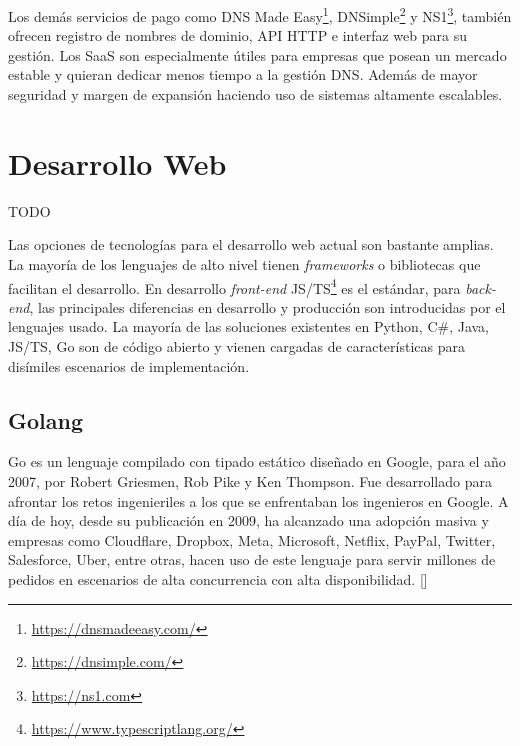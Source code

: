 Los demás servicios de pago como DNS Made Easy\footnote{\url{https://dnsmadeeasy.com/}}, DNSimple\footnote{\url{https://dnsimple.com/}} y NS1\footnote{\url{https://ns1.com}}, también ofrecen registro de nombres de dominio, API HTTP e interfaz web para su gestión. Los SaaS son especialmente útiles para empresas que posean un mercado estable y quieran dedicar menos tiempo a la gestión DNS. Además de mayor seguridad y margen de expansión haciendo uso de sistemas altamente escalables.






\section{Desarrollo Web}

TODO

Las opciones de tecnologías para el desarrollo web actual son bastante amplias. La mayoría de los lenguajes de alto nivel tienen \textit{frameworks} o bibliotecas que facilitan el desarrollo. En desarrollo \textit{front-end} JS/TS\footnote{\url{https://www.typescriptlang.org/}} es el estándar, para \textit{back-end}, las principales diferencias en desarrollo y producción son introducidas por el lenguajes usado. La mayoría de las soluciones existentes en Python, C\#, Java, JS/TS, Go son de código abierto y vienen cargadas de características para disímiles escenarios de implementación.

\subsection{Golang}

Go es un lenguaje compilado con tipado estático diseñado en Google, para el año 2007, por Robert Griesmen, Rob Pike y Ken Thompson. Fue desarrollado para afrontar los retos ingenieriles a los que se enfrentaban los ingenieros en Google. A día de hoy, desde su publicación en 2009, ha alcanzado una adopción masiva y empresas como Cloudflare, Dropbox, Meta, Microsoft, Netflix, PayPal, Twitter, Salesforce, Uber, entre otras, hacen uso de este lenguaje para servir millones de pedidos en escenarios de alta concurrencia con alta disponibilidad. [\cite{go-docs}]

